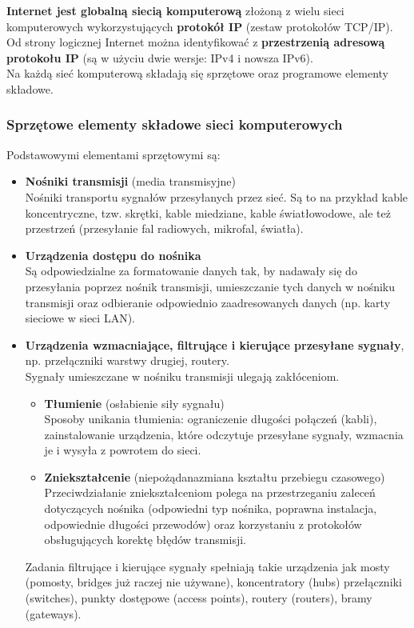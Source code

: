 \documentclass[a4paper]{article}
\begin{document}
\textbf{Internet jest globalną	 siecią	 komputerową} złożoną z	 wielu	 sieci	 komputerowych wykorzystujących	 \textbf{protokół IP} (zestaw protokołów TCP/IP). Od strony	 logicznej	 Internet można	identyfikować	z	\textbf{przestrzenią	adresową	protokołu	IP}	 (są	w użyciu	dwie wersje:	IPv4 i nowsza IPv6).\\
Na	każdą	sieć	komputerową	składają	się	sprzętowe	oraz	programowe	elementy	składowe.

\subsubsection{Sprzętowe	elementy	składowe	sieci	komputerowych}
Podstawowymi	elementami	sprzętowymi	są:
\begin{itemize}
    \item \textbf{Nośniki	transmisji}	(media	transmisyjne)\\
    Nośniki	 transportu	 sygnałów	 przesyłanych	 przez	 sieć. Są to na przykład kable koncentryczne, tzw.
    skrętki, kable miedziane,  kable	 światłowodowe,	 ale	 też	 przestrzeń (przesyłanie	fal	radiowych,	mikrofal,	światła).
    \item \textbf{Urządzenia	dostępu do	nośnika}\\
    Są odpowiedzialne za	formatowanie danych	tak, by nadawały się do	 przesyłania poprzez nośnik	 transmisji, umieszczanie	 tych	 danych	 w nośniku	transmisji	oraz	odbieranie	odpowiednio zaadresowanych	danych	(np. karty sieciowe w sieci LAN).
    \item \textbf{Urządzenia	wzmacniające,	filtrujące	i	kierujące	przesyłane	sygnały},	np.	przełączniki warstwy	drugiej, routery.\\
    Sygnały	 umieszczane w	 nośniku transmisji ulegają zakłóceniom.
    \begin{itemize}
        \item \textbf{Tłumienie} (osłabienie siły sygnału)\\
        Sposoby unikania tłumienia:  ograniczenie	 długości	 połączeń	 (kabli), zainstalowanie	urządzenia,	które odczytuje	przesyłane	sygnały,	wzmacnia	je	i
        wysyła	z	powrotem	do	sieci.
        \item \textbf{Zniekształcenie} (niepożądanazmiana kształtu przebiegu czasowego)\\
        Przeciwdziałanie	 zniekształceniom polega	 na	 przestrzeganiu	 zaleceń dotyczących	 nośnika	 (odpowiedni typ nośnika, poprawna instalacja, odpowiednie	 długości	 przewodów) oraz korzystaniu z protokołów obsługujących korektę	błędów	transmisji.
    \end{itemize}
    Zadania	filtrujące	i	kierujące	sygnały	spełniają	takie	urządzenia	jak	mosty (pomosty,	bridges już	 raczej	 nie	 używane),	 koncentratory (hubs)	 przełączniki (switches), punkty	 dostępowe (access points), routery (routers),	bramy (gateways).
\end{itemize}
\end{document}
